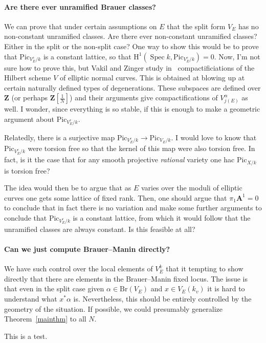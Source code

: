 \documentclass[10pt,letterpaper,twoside]{article}
\renewcommand{\H}{\mathrm{H}}
\renewcommand{\1}{\mathbf{1}}
\newcommand{\bA}{\mathbf{A}}
\newcommand{\bZ}{\mathbf{Z}}
\newcommand{\Pic}{\mathrm{Pic}}
\newcommand{\Br}{\mathrm{Br}}
\DeclareMathOperator{\Spec}{Spec}
\theoremstyle{plain}
\theoremstyle{plain}
\theoremstyle{definition}
\theoremstyle{named}
\theoremstyle{definition}
\begin{document}
\paragraph{Are there ever unramified Brauer classes?} We can prove that under certain assumptions on
$E$ that the split form $V_E$ has no non-constant unramified classes. Are there ever non-constant
unramified classes? Either in the split or the non-split case? One way to show this would be to
prove that $\Pic_{V^c_E/k}$ is a constant lattice, so that $\H^1(\Spec k,\Pic_{V^c_E/k})=0$. Now,
I'm not sure how to prove this, but Vakil and Zinger study
in~\cite{vakil-zinger,vakil-zinger-announce} compactificiations of the Hilbert scheme $V$ of elliptic normal
curves. This is obtained at blowing up at certain naturally defined types of degenerations. These
subspaces are defined over $\bZ$ (or perhaps $\bZ[\tfrac{1}{N}]$) and their arguments give
compactifications of $V_{j(E)}^\alpha$ as well. I wonder, since everything is so stable, if this is
enough to make a geometric argument about $\Pic_{V^c_E/k}$.

Relatedly, there is a surjective map $\Pic_{V^c_E/k}\rightarrow\Pic_{V_E/k}$. I would love to know
that $\Pic_{V^c_E/k}$ were torsion free so that the kernel of this map were also torsion free. In
fact, is it the case that for any smooth projective {\em rational} variety one hac $\Pic_{X/k}$ is
torsion free?

The idea would then be to argue that as $E$ varies over the moduli of elliptic curves one gets some
lattice of fixed rank. Then, one should argue that $\pi_1\bA^1=0$ to conclude that in fact there is
no variation and make some further arguments to conclude that $\Pic_{V^c_E/k}$ is a constant
lattice, from which it would follow that the unramified classes are always constant. Is this
feasible at all?

\paragraph{Can we just compute Brauer--Manin directly?} We have such control over the local elements
of $V_E^k$ that it tempting to show directly that there are elements in the Brauer--Manin fixed
locus. The issue is that even in the split case given $\alpha\in\Br(V_E)$ and $x\in V_E(k_v)$ it is
hard to understand what $x^*\alpha$ is.
Nevertheless, this should be entirely controlled by the geometry of the situation. If possible, we
could presumably generalize Theorem~\ref{mainthm} to all $N$.

This is a test.


\small


\end{document}
